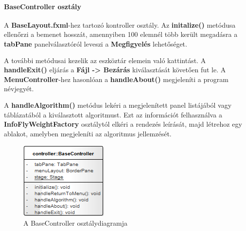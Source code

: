 \documentclass{elteikthesis}
\begin{document}
\paragraph{BaseController osztály}
A \textbf{BaseLayout.fxml}-hez tartozó kontroller osztály. Az \textbf{initalize()} metódusa ellenőrzi a bemenet hosszát, amennyiben 100 elemnél több került megadásra a \textbf{tabPane} panelválasztóról leveszi a \textbf{Megfigyelés} lehetőséget.\par
 A további metódusai kezelik az eszköztár elemein való kattintást. A \textbf{handleExit()} eljárás a \textbf{Fájl -> Bezárás} kiválasztását követően fut le. A \textbf{MenuController}-hez hasonlóan a \textbf{handleAbout()} megjeleníti a program névjegyét.\par
 A \textbf{handleAlgorithm()} metódus lekéri a megjelenített panel listájából vagy táblázatából a kiválasztott algoritmust. Ezt az információt felhasználva a \textbf{InfoFlyWeightFactory} osztálytól elkéri a  rendezés leírását, majd létrehoz egy ablakot, amelyben megjeleníti az algoritmus jellemzését.
\begin{figure}[H]
	\centering
	\includegraphics{pics/class/BaseController.png}
	\caption{A BaseController osztálydiagramja}
\end{figure}
\end{document}
